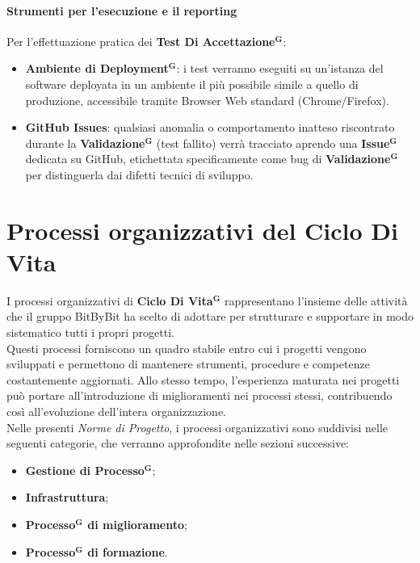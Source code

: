 \documentclass[a4paper,12pt]{article}
\newcommand{\term}[1]{\textbf{#1}$^\mathbf{G}$}
\begin{document}
\paragraph{Strumenti per l'esecuzione e il reporting}
Per l'effettuazione pratica dei \term{Test Di Accettazione}:
\begin{itemize}
    \item \textbf{Ambiente di \term{Deployment}}: i test verranno eseguiti su un'istanza del software deployata in un ambiente il più possibile simile a quello di produzione, accessibile tramite Browser Web standard (Chrome/Firefox).
    \item \textbf{GitHub Issues}: qualsiasi anomalia o comportamento inatteso riscontrato durante la \term{Validazione} (test fallito) verrà tracciato aprendo una \term{Issue} dedicata su GitHub, etichettata specificamente come bug di \term{Validazione} per distinguerla dai difetti tecnici di sviluppo.
\end{itemize}

\section{Processi organizzativi del Ciclo Di Vita}
I processi organizzativi di \term{Ciclo Di Vita} rappresentano l’insieme delle attività che il gruppo BitByBit ha scelto di adottare per strutturare e supportare in modo sistematico tutti i propri progetti.\\
Questi processi forniscono un quadro stabile entro cui i progetti vengono sviluppati e permettono di mantenere strumenti, procedure e competenze costantemente aggiornati. Allo stesso tempo, l’esperienza maturata nei progetti può portare all’introduzione di miglioramenti nei processi stessi, contribuendo così all’evoluzione dell’intera organizzazione.\\
Nelle presenti \textit{Norme di Progetto}, i processi organizzativi sono suddivisi nelle seguenti categorie, che verranno approfondite nelle sezioni successive:
\begin{itemize}
    \item \textbf{Gestione di \term{Processo}};
    \item \textbf{Infrastruttura};
    \item \textbf{\term{Processo} di miglioramento};
    \item \textbf{\term{Processo} di formazione}.
\end{itemize}
\end{document}
